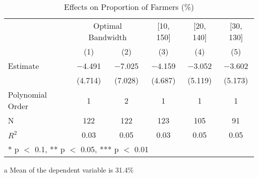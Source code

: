 \begin{table}[!h]

\caption{Effects on Proportion of Farmers (\%) \label{tab:rdd_farmers}}
\centering
\begin{threeparttable}
\begin{tabular}[t]{lccccc}
\toprule
\multicolumn{1}{c}{} & \multicolumn{2}{c}{Optimal Bandwidth} & \multicolumn{1}{c}{[10, 150]} & \multicolumn{1}{c}{[20, 140]} & \multicolumn{1}{c}{[30, 130]} \\
\cmidrule(l{3pt}r{3pt}){2-3} \cmidrule(l{3pt}r{3pt}){4-4} \cmidrule(l{3pt}r{3pt}){5-5} \cmidrule(l{3pt}r{3pt}){6-6}
  & (1) & (2) & (3) & (4) & (5)\\
\midrule
Estimate & \num{-4.491} & \num{-7.025} & \num{-4.159} & \num{-3.052} & \num{-3.602}\\
 & (\num{4.714}) & (\num{7.028}) & (\num{4.687}) & (\num{5.119}) & (\num{5.173})\\

\midrule
Polynomial Order & 1 & 2 & 1 & 1 & 1\\
N & \num{122} & \num{122} & \num{123} & \num{105} & \num{91}\\
$R^2$ & \num{0.03} & \num{0.05} & \num{0.03} & \num{0.05} & \num{0.05}\\
\bottomrule
\multicolumn{6}{l}{\rule{0pt}{1em}* p $<$ 0.1, ** p $<$ 0.05, *** p $<$ 0.01}\\
\end{tabular}
\begin{tablenotes}
\item[a] Mean of the dependent variable is 31.4\%
\end{tablenotes}
\end{threeparttable}
\end{table}
